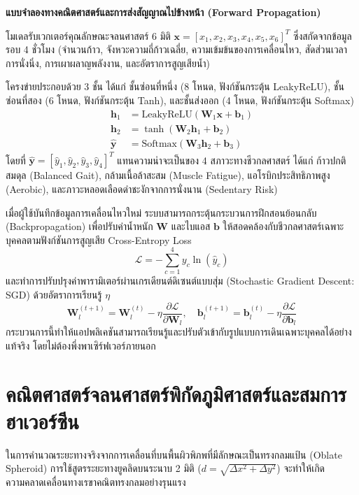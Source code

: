 \begin{theorybox}
\textbf{แบบจำลองทางคณิตศาสตร์และการส่งสัญญาณไปข้างหน้า (Forward Propagation)}

โมเดลรับเวกเตอร์คุณลักษณะจลนศาสตร์ 6 มิติ $\mathbf{x} = [x_1, x_2, x_3, x_4, x_5, x_6]^T$ ซึ่งสกัดจากข้อมูลรอบ 4 ชั่วโมง (จำนวนก้าว, จังหวะความถี่ก้าวเฉลี่ย, ความเข้มข้นของการเคลื่อนไหว, สัดส่วนเวลาการนั่งนิ่ง, การเผาผลาญพลังงาน, และอัตราการสูญเสียน้ำ)

โครงข่ายประกอบด้วย 3 ชั้น ได้แก่ ชั้นซ่อนที่หนึ่ง (8 โหนด, ฟังก์ชันกระตุ้น LeakyReLU), ชั้นซ่อนที่สอง (6 โหนด, ฟังก์ชันกระตุ้น Tanh), และชั้นส่งออก (4 โหนด, ฟังก์ชันกระตุ้น Softmax)
\begin{align}
\mathbf{h}_1 &= \text{LeakyReLU}(\mathbf{W}_1 \mathbf{x} + \mathbf{b}_1) \\
\mathbf{h}_2 &= \tanh(\mathbf{W}_2 \mathbf{h}_1 + \mathbf{b}_2) \\
\hat{\mathbf{y}} &= \text{Softmax}(\mathbf{W}_3 \mathbf{h}_2 + \mathbf{b}_3)
\end{align}
โดยที่ $\hat{\mathbf{y}} = [\hat{y}_1, \hat{y}_2, \hat{y}_3, \hat{y}_4]^T$ แทนความน่าจะเป็นของ 4 สภาวะทางชีวกลศาสตร์ ได้แก่ ก้าวปกติสมดุล (Balanced Gait), กล้ามเนื้อล้าสะสม (Muscle Fatigue), แอโรบิกประสิทธิภาพสูง (Aerobic), และภาวะหลอดเลือดดำชะงักจากการนั่งนาน (Sedentary Risk)
\end{theorybox}

เมื่อผู้ใช้บันทึกข้อมูลการเคลื่อนไหวใหม่ ระบบสามารถกระตุ้นกระบวนการฝึกสอนย้อนกลับ (Backpropagation) เพื่อปรับค่าน้ำหนัก $\mathbf{W}$ และไบแอส $\mathbf{b}$ ให้สอดคล้องกับชีวกลศาสตร์เฉพาะบุคคลตามฟังก์ชันการสูญเสีย Cross-Entropy Loss
\begin{equation}
\mathcal{L} = -\sum_{c=1}^4 y_c \ln(\hat{y}_c)
\end{equation}
และทำการปรับปรุงค่าพารามิเตอร์ผ่านเกรเดียนต์ดิเซนต์แบบสุ่ม (Stochastic Gradient Descent: SGD) ด้วยอัตราการเรียนรู้ $\eta$
\begin{equation}
\mathbf{W}_l^{(t+1)} = \mathbf{W}_l^{(t)} - \eta \frac{\partial \mathcal{L}}{\partial \mathbf{W}_l}, \quad \mathbf{b}_l^{(t+1)} = \mathbf{b}_l^{(t)} - \eta \frac{\partial \mathcal{L}}{\partial \mathbf{b}_l}
\end{equation}
กระบวนการนี้ทำให้แอปพลิเคชันสามารถเรียนรู้และปรับตัวเข้ากับรูปแบบการเดินเฉพาะบุคคลได้อย่างแท้จริง โดยไม่ต้องพึ่งพาเซิร์ฟเวอร์ภายนอก

\section{คณิตศาสตร์จลนศาสตร์พิกัดภูมิศาสตร์และสมการฮาเวอร์ซีน}
ในการคำนวณระยะทางจริงจากการเคลื่อนที่บนพื้นผิวพิภพที่มีลักษณะเป็นทรงกลมแป้น (Oblate Spheroid) การใช้สูตรระยะทางยูคลิดบนระนาบ 2 มิติ ($d = \sqrt{\Delta x^2 + \Delta y^2}$) จะทำให้เกิดความคลาดเคลื่อนทางเรขาคณิตทรงกลมอย่างรุนแรง

